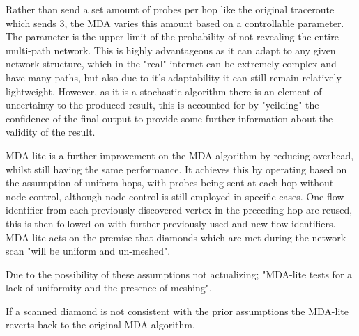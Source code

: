 Rather than send a set amount of probes per hop like the original traceroute which sends 3, the MDA varies this amount based on a controllable parameter. \cite{MDA2} The parameter is the upper limit of the probability of not revealing the entire multi-path network. This is highly advantageous as it can adapt to any given network structure, which in the "real" internet can be extremely complex and have many paths, but also due to it's adaptability it can still remain relatively lightweight. However, as it is a stochastic algorithm there is an element of uncertainty to the produced result, this is accounted for by "yeilding" the  confidence of the final output to provide some further information about the validity of the result. \cite{MDA-lite}\cite{diamond-miner}\cite{MDA3}



MDA-lite is a further improvement on the MDA algorithm by reducing overhead, whilst still having the same performance. It achieves this by operating based on the assumption of uniform hops, with probes being sent at each hop without node control, although node control is still employed in specific cases. One flow identifier from each previously discovered vertex in the preceding hop are reused, this is then followed on with further previously used and new flow identifiers. MDA-lite acts on the premise that diamonds which are met during the network scan "will be uniform and un-meshed". \cite{MDA-lite} 

Due to the possibility of these assumptions not actualizing; "MDA-lite tests for a lack of uniformity and the presence of meshing". \cite{MDA-lite} 

If a scanned diamond is not consistent with the prior assumptions the MDA-lite reverts back to the original MDA algorithm. 

